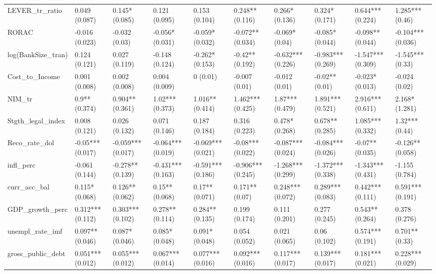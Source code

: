 \begin{table}[H]
\begin{adjustbox}{totalheight=2.5in, width=\columnwidth }
\begin{subtable}[c]{1.1\textwidth}
{\begin{tabular}{llllllllll}
  LEVER\_tr\_ratio & 0.049 (0.087) & 0.145* (0.085) & 0.121 (0.095) & 0.153 (0.104) & 0.248** (0.116) & 0.266* (0.136) & 0.324* (0.171) & 0.644*** (0.224) & 1.285*** (0.46) \\ 
  RORAC & -0.016 (0.023) & -0.032 (0.03) & -0.056* (0.031) & -0.059* (0.032) & -0.072** (0.034) & -0.069* (0.04) & -0.085* (0.044) & -0.098** (0.044) & -0.104*** (0.036) \\ 
  log(BankSize\_tran) & 0.124 (0.121) & 0.027 (0.119) & -0.148 (0.124) & -0.262* (0.153) & -0.42** (0.192) & -0.632*** (0.226) & -0.983*** (0.269) & -1.547*** (0.309) & -1.545*** (0.33) \\ 
  Cost\_to\_Income & 0.001 (0.008) & 0.002 (0.008) & 0.004 (0.009) & 0 (0.01) & -0.007 (0.01) & -0.012 (0.01) & -0.02** (0.01) & -0.023* (0.013) & -0.024 (0.02) \\ 
  NIM\_tr & 0.9** (0.374) & 0.904** (0.361) & 1.02*** (0.373) & 1.016** (0.414) & 1.462*** (0.425) & 1.87*** (0.479) & 1.891*** (0.521) & 2.916*** (0.611) & 2.168* (1.281) \\ 
  Stgth\_legal\_index & 0.008 (0.121) & 0.026 (0.132) & 0.071 (0.146) & 0.187 (0.184) & 0.316 (0.223) & 0.478* (0.268) & 0.678** (0.285) & 1.085*** (0.332) & 1.32*** (0.44) \\ 
  Reco\_rate\_dol & -0.05*** (0.017) & -0.059*** (0.017) & -0.064*** (0.019) & -0.069*** (0.021) & -0.08*** (0.022) & -0.087*** (0.024) & -0.084*** (0.026) & -0.07** (0.035) & -0.126** (0.058) \\ 
  infl\_perc & -0.061 (0.144) & -0.278** (0.139) & -0.431*** (0.163) & -0.591*** (0.186) & -0.906*** (0.245) & -1.268*** (0.299) & -1.372*** (0.338) & -1.343*** (0.431) & -1.155 (0.784) \\ 
  curr\_acc\_bal & 0.115* (0.068) & 0.126** (0.062) & 0.15** (0.068) & 0.17** (0.071) & 0.171** (0.07) & 0.248*** (0.072) & 0.289*** (0.083) & 0.442*** (0.111) & 0.591*** (0.191) \\ 
  GDP\_growth\_perc & 0.312*** (0.112) & 0.303*** (0.102) & 0.278** (0.114) & 0.284** (0.135) & 0.199 (0.174) & 0.111 (0.201) & 0.277 (0.245) & 0.543** (0.264) & 0.378 (0.276) \\ 
  unempl\_rate\_imf & 0.097** (0.046) & 0.087* (0.046) & 0.085* (0.048) & 0.091* (0.048) & 0.054 (0.052) & 0.021 (0.065) & 0.06 (0.102) & 0.574*** (0.191) & 0.701** (0.33) \\ 
  gross\_public\_debt & 0.051*** (0.012) & 0.055*** (0.012) & 0.067*** (0.014) & 0.077*** (0.016) & 0.092*** (0.016) & 0.117*** (0.017) & 0.139*** (0.017) & 0.181*** (0.021) & 0.228*** (0.029) \\ 

\end{tabular}}
\end{subtable}
\end{adjustbox}
\end{table}
